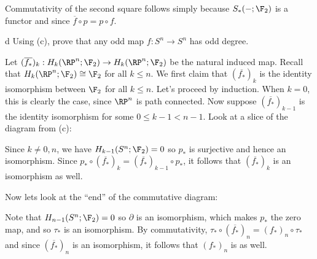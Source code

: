 \documentclass[11pt,letterpaper]{article}
\begin{document}
\begin{solution}
    \quad Commutativity of the second square follows simply because $S_*(-; \F_2)$ is a functor and since $\overline{f}\circ p = p\circ f$.

    \begin{partproblem}{d}
        Using (c), prove that any odd map $f : S^n \to S^n$ has odd degree.
    \end{partproblem}

    \quad Let $(\overline{f_*})_k : H_k(\RP^n; \F_2) \to H_k(\RP^n; \F_2)$ be the natural induced map. Recall that $H_k(\RP^n; \F_2)\cong \F_2$ for all $k\leq n$. We first claim that $(\overline{f_*})_k$ is the identity isomorphism between $\F_2$ for all $k\leq n$. Let's proceed by induction. When $k=0$, this is clearly the case, since $\RP^n$ is path connected. Now suppose $(\overline{f_*})_{k-1}$ is the identity isomorphism for some $0\leq k-1 < n-1$. Look at a slice of the diagram from (c):
    \begin{center}
    \end{center}
    Since $k\neq 0,n$, we have $H_{k-1}(S^n; \F_2)=0$ so $p_*$ is surjective and hence an isomorphism. Since $p_*\circ (\overline{f_*})_k = (\overline{f_*})_{k-1}\circ p_*$, it follows that $(\overline{f_*})_k$ is an isomorphism as well. 

    \quad Now lets look at the ``end'' of the commutative diagram:
    \begin{center}
    \end{center}    
    Note that $H_{n-1}(S^n; \F_2)=0$ so $\partial$ is an isomorphism, which makes $p_*$ the zero map, and so $\tau_*$ is an isomorphism. By commutativity, $\tau_*\circ (\overline{f_*})_n =(f_*)_n\circ \tau_*$ and since $(\overline{f_*})_n$ is an isomorphism, it follows that $(f_*)_n$ is as well.
    

\end{solution}
\end{document}
